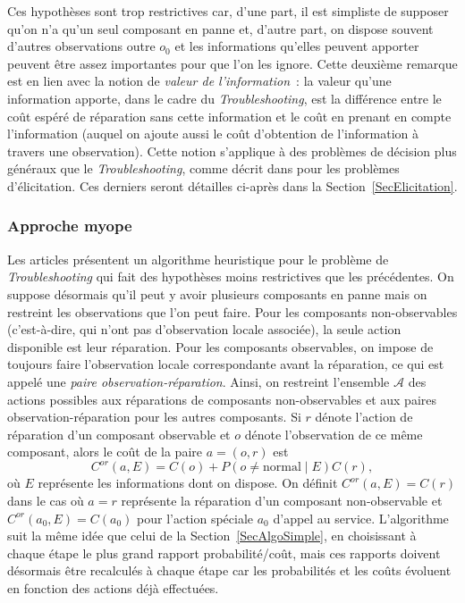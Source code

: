 \documentclass[a4paper,11pt]{article}
\theoremstyle{plain}
\theoremstyle{definition}
\begin{document}
Ces hypothèses sont trop restrictives car, d'une part, il est simpliste de supposer qu'on n'a qu'un seul composant en panne et, d'autre part, on dispose souvent d'autres observations outre $o_0$ et les informations qu'elles peuvent apporter peuvent être assez importantes pour que l'on les ignore. Cette deuxième remarque est en lien avec la notion de \emph{valeur de l'information}~: la valeur qu'une information apporte, dans le cadre du \emph{Troubleshooting}, est la différence entre le coût espéré de réparation sans cette information et le coût en prenant en compte l'information (auquel on ajoute aussi le coût d'obtention de l'information à travers une observation). Cette notion s'applique à des problèmes de décision plus généraux que le \emph{Troubleshooting}, comme décrit dans \cite{Braziunas_2008} pour les problèmes d'élicitation. Ces derniers seront détailles ci-après dans la Section~\ref{SecElicitation}.

\subsubsection{Approche myope}
\label{SecMyope}

Les articles \cite{heckerman1994troubleshooting, Heckerman_1995} présentent un algorithme heuristique pour le problème de \emph{Troubleshooting} qui fait des hypothèses moins restrictives que les précédentes. On suppose désormais qu'il peut y avoir plusieurs composants en panne mais on restreint les observations que l'on peut faire. Pour les composants non-observables (c'est-à-dire, qui n'ont pas d'observation locale associée), la seule action disponible est leur réparation. Pour les composants observables, on impose de toujours faire l'observation locale correspondante avant la réparation, ce qui est appelé une \emph{paire observation-réparation}. Ainsi, on restreint l'ensemble $\mathcal A$ des actions possibles aux réparations de composants non-observables et aux paires observation-réparation pour les autres composants. Si $r$ dénote l'action de réparation d'un composant observable et $o$ dénote l'observation de ce même composant, alors le coût de la paire $a = (o, r)$ est
\begin{equation}
\label{EqCor}
C^{or}(a, E) = C(o) + P(o \neq \text{normal} \mid E) C(r),
\end{equation}
où $E$ représente les informations dont on dispose. On définit $C^{or}(a, E) = C(r)$ dans le cas où $a = r$ représente la réparation d'un composant non-observable et $C^{or}(a_0, E) = C(a_0)$ pour l'action spéciale $a_0$ d'appel au service. L'algorithme suit la même idée que celui de la Section~\ref{SecAlgoSimple}, en choisissant à chaque étape le plus grand rapport probabilité/coût, mais ces rapports doivent désormais être recalculés à chaque étape car les probabilités et les coûts évoluent en fonction des actions déjà effectuées.
\end{document}
